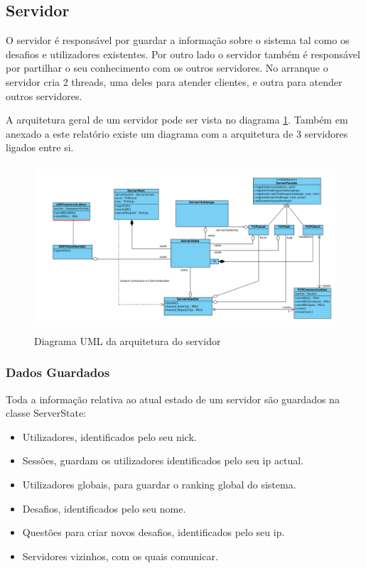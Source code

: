 \documentclass[runningheads,a4paper]{llncs}
\begin{document}
\subsection{Servidor}

O servidor é responsável por guardar a informação sobre o sistema tal como os desafios e utilizadores existentes. Por outro lado o servidor também é responsável por partilhar o seu conhecimento com os outros servidores.
No arranque o servidor cria 2 threads, uma deles para atender clientes, e outra para atender outros servidores.

A arquitetura geral de um servidor pode ser vista no diagrama \ref{fig:diagram-arq-geral}.
Também em anexado a este relatório existe um diagrama com a arquitetura de 3 servidores ligados entre si.

\begin{figure}
\centering
\includegraphics[height=6.2cm]{arq-geral.png}
\caption{Diagrama UML da arquitetura do servidor}
\label{fig:diagram-arq-geral}
\end{figure}


\subsubsection{Dados Guardados}

Toda a informação relativa ao atual estado de um servidor são guardados na classe ServerState:
\begin{itemize}
  \item Utilizadores, identificados pelo seu nick.
  \item Sessões, guardam os utilizadores identificados pelo seu ip actual.
  \item Utilizadores globais, para guardar o ranking global do sistema.
  \item Desafios, identificados pelo seu nome.
  \item Questões para criar novos desafios, identificados pelo seu ip.
  \item Servidores vizinhos, com os quais comunicar.
\end{itemize}
\end{document}

